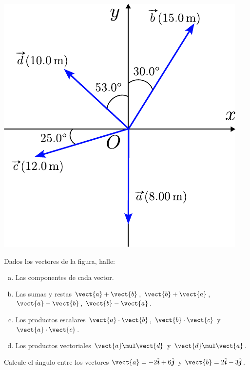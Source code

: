 \documentclass[11pt]{article}
\begin{document}
\begin{exercise}
    \begin{multicols}{2}
        \begin{center}
            \includegraphics[scale=0.85]{figs/fig-08.pdf}
        \end{center}

        Dados los vectores de la figura, halle:
        \begin{enumerate}[a)]
            \item Las componentes de cada vector.
            \item Las sumas y restas $\vect{a} + \vect{b}$, $\vect{b} + \vect{a}$, $\vect{a} - \vect{b}$, $\vect{b} - \vect{a}$. 
            \item Los productos escalares $\vect{a} \cdot \vect{b}$, $\vect{b} \cdot \vect{c}$ y $\vect{a} \cdot \vect{c}$. 
            \item Los productos vectoriales $\vect{a} \mul \vect{d}$ y $\vect{d} \mul \vect{a}$.
        \end{enumerate}
    \end{multicols}
\end{exercise}

\begin{exercise}
    Calcule el ángulo entre los vectores $\vect{a} = -2 \hat{\bm{i}} + 6 \hat{\bm{j}}$ y  $\vect{b} = 2 \hat{\bm{i}} - 3 \hat{\bm{j}}$.
\end{exercise}
\end{document}
